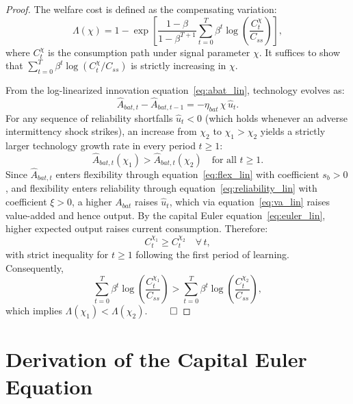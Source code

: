 \documentclass[12pt, a4paper]{article}
\begin{document}
\begin{proof}
The welfare cost is defined as the compensating variation:
\begin{equation*}
\Lambda(\chi) = 1 - \exp\!\left[\frac{1-\beta}{1-\beta^{T+1}} \sum_{t=0}^{T} \beta^t \log\!\left(\frac{C_t^{\chi}}{C_{ss}}\right)\right],
\end{equation*}
where $C_t^{\chi}$ is the consumption path under signal parameter $\chi$. It suffices to show that $\sum_{t=0}^{T}\beta^t \log(C_t^{\chi}/C_{ss})$ is strictly increasing in $\chi$.

From the log-linearized innovation equation~\eqref{eq:abat_lin}, technology evolves as:
\begin{equation*}
\hat{A}_{bat,t} - \hat{A}_{bat,t-1} = -\eta_{bat}\,\chi\,\hat{u}_t.
\end{equation*}
For any sequence of reliability shortfalls $\hat{u}_t < 0$ (which holds whenever an adverse intermittency shock strikes), an increase from $\chi_2$ to $\chi_1 > \chi_2$ yields a strictly larger technology growth rate in every period $t \geq 1$:
\begin{equation*}
\hat{A}_{bat,t}(\chi_1) > \hat{A}_{bat,t}(\chi_2)\quad \text{for all } t \geq 1.
\end{equation*}
Since $\hat{A}_{bat,t}$ enters flexibility through equation~\eqref{eq:flex_lin} with coefficient $s_b > 0$, and flexibility enters reliability through equation~\eqref{eq:reliability_lin} with coefficient $\xi > 0$, a higher $A_{bat}$ raises $\hat{u}_t$, which via equation~\eqref{eq:va_lin} raises value-added and hence output. By the capital Euler equation~\eqref{eq:euler_lin}, higher expected output raises current consumption. Therefore:
\begin{equation*}
C_t^{\chi_1} \geq C_t^{\chi_2}\quad \forall\, t,
\end{equation*}
with strict inequality for $t \geq 1$ following the first period of learning. Consequently,
\begin{equation*}
\sum_{t=0}^{T}\beta^t \log\!\left(\frac{C_t^{\chi_1}}{C_{ss}}\right) > \sum_{t=0}^{T}\beta^t \log\!\left(\frac{C_t^{\chi_2}}{C_{ss}}\right),
\end{equation*}
which implies $\Lambda(\chi_1) < \Lambda(\chi_2)$. $\qed$
\end{proof}


\section{Derivation of the Capital Euler Equation} \label{app:deriv_euler}
\end{document}
